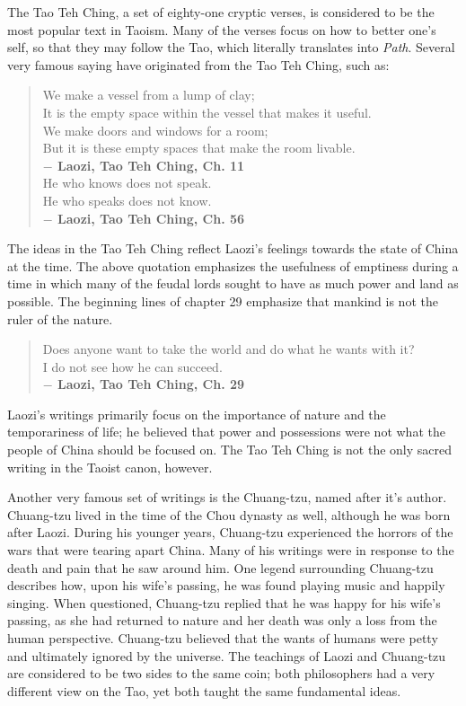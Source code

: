 \documentclass[12pt]{article}
\begin{document}
The Tao Teh Ching, a set of eighty-one cryptic verses, is considered to be the most popular text in Taoism. Many of the verses focus on how to better one's self, so that they may follow the Tao, which literally translates into \textit{Path}. Several very famous saying have originated from the Tao Teh Ching, such as:
\begin{quote}
We make a vessel from a lump of clay;\\
It is the empty space within the vessel that makes it useful.\\
We make doors and windows for a room;\\
But it is these empty spaces that make the room livable.\\
\textbf{$-$ Laozi, Tao Teh Ching, Ch. 11}\\
He who knows does not speak.\\
He who speaks does not know.\\
\textbf{$-$ Laozi, Tao Teh Ching, Ch. 56}
\end{quote}
The ideas in the Tao Teh Ching reflect Laozi's feelings towards the state of China at the time. The above quotation emphasizes the usefulness of emptiness during a time in which many of the feudal lords sought to have as much power and land as possible. The beginning lines of chapter 29 emphasize that mankind is not the ruler of the nature.
\begin{quote}
Does anyone want to take the world and do what he wants with it?\\
I do not see how he can succeed.\\
\textbf{$-$ Laozi, Tao Teh Ching, Ch. 29}
\end{quote}
Laozi's writings primarily focus on the importance of nature and the temporariness of life; he believed that power and possessions were not what the people of China should be focused on. The Tao Teh Ching is not the only sacred writing in the Taoist canon, however.

Another very famous set of writings is the Chuang-tzu, named after it's author. Chuang-tzu lived in the time of the Chou dynasty as well, although he was born after Laozi. During his younger years, Chuang-tzu experienced the horrors of the wars that were tearing apart China. Many of his writings were in response to the death and pain that he saw around him. One legend surrounding Chuang-tzu describes how, upon his wife's passing, he was found playing music and happily singing. When questioned, Chuang-tzu replied that he was happy for his wife's passing, as she had returned to nature and her death was only a loss from the human perspective. Chuang-tzu believed that the wants of humans were petty and ultimately ignored by the universe. The teachings of Laozi and Chuang-tzu are considered to be two sides to the same coin; both philosophers had a very different view on the Tao, yet both taught the same fundamental ideas.
\end{document}
